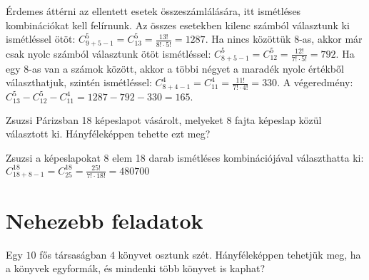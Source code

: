 \begin{solution}
Érdemes áttérni az ellentett esetek összeszámlálására, itt ismétléses
kombinációkat kell felírnunk. Az összes esetekben kilenc számból választunk
ki ismétléssel ötöt: $C_{9+5-1}^{5}=C_{13}^{5}=\frac{13!}{8!\cdot5!}=1287.$
Ha nincs közöttük 8-as, akkor már csak nyolc számból választunk ötöt
ismétléssel: $C_{8+5-1}^{5}=C_{12}^{5}=\frac{12!}{7!\cdot5!}=792.$
Ha egy 8-as van a számok között, akkor a többi négyet a maradék nyolc
értékből választhatjuk, szintén ismétléssel: $C_{8+4-1}^{4}=C_{11}^{4}=\frac{11!}{7!\cdot4!}=330.$
A végeredmény: $C_{13}^{5}-C_{12}^{5}-C_{11}^{4}=1287-792-330=165.$
\end{solution}
\begin{problem}
 Zsuzsi Párizsban 18 képeslapot vásárolt, melyeket 8 fajta képeslap
közül választott ki. Hányféleképpen tehette ezt meg? 
\end{problem}

\begin{solution}
Zsuzsi a képeslapokat 8 elem 18 darab ismétléses kombinációjával választhatta
ki: $C_{18+8-1}^{18}=C_{25}^{18}=\frac{25!}{7!\cdot18!}=480700$
\end{solution}

\section*{Nehezebb feladatok}
\begin{extraproblem}
Egy $10$ fős társaságban $4$ könyvet osztunk szét. Hányféleképpen
tehetjük meg, ha a könyvek egyformák, és mindenki több könyvet is
kaphat? 
\end{extraproblem}

